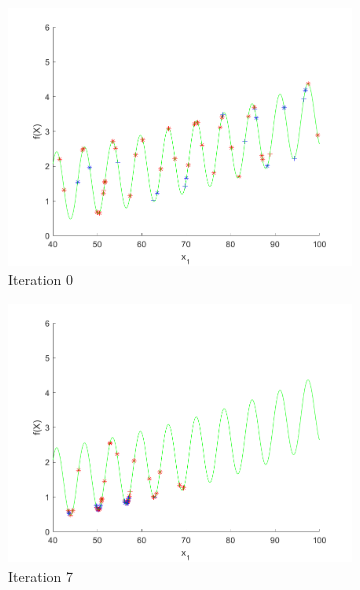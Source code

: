 \begin{figure}
 \begin{subfigure}[b]{0.4\textwidth}
   \includegraphics[width=\textwidth]{img/smpl/grwnk1dshft/loa-iter-0}
   \caption{Iteration 0}
   \label{fig:s3-iter-0}
 \end{subfigure}
 \begin{subfigure}[b]{0.4\textwidth}
   \includegraphics[width=\textwidth]{img/smpl/grwnk1dshft/loa-iter-7}
   \caption{Iteration 7}
   \label{fig:s3-iter-1}
 \end{subfigure}
 \begin{subfigure}[b]{0.4\textwidth}

\end{subfigure}
\end{figure}
